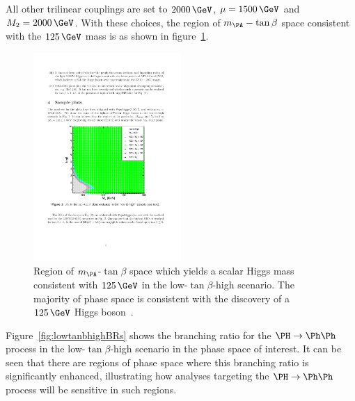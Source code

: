 
All other trilinear couplings are set to $2000\,\GeV$, $\mu=1500\,\GeV$ and
$M_{2}=2000\,\GeV$. With these choices, the region of $m_{\PA}-\tan\beta$ space
consistent with the $125\,\GeV$ mass is as shown in
figure~\ref{fig:lowtanbhighmass}.

\begin{figure}[htbp]
   \includegraphics[width=0.5\textwidth]{plots/theory/low-tanb-high-mass.pdf}
\caption[Region of $m_{\PA}$-$\tan\beta$ space which yields a scalar Higgs mass 
consistent with $125\,\GeV$ in the low-$\tan\beta$-high scenario.]{
    Region of $m_{\PA}$-$\tan\beta$ space which yields a scalar Higgs mass 
consistent with $125\,\GeV$ in the low-$\tan\beta$-high scenario. The
majority of phase space is consistent with the discovery of a $125\,\GeV$ Higgs
boson~\cite{lowtanbhighwiki}.}
\label{fig:lowtanbhighmass}
\end{figure}

Figure~\ref{fig:lowtanbhighBRs} shows the branching ratio for the $\PH\to\Ph\Ph$
process in the low-$\tan\beta$-high scenario in the phase space of interest. It
can be seen that there are regions of phase space where this branching ratio is
significantly enhanced, illustrating how analyses targeting the $\PH\to\Ph\Ph$ process will be
sensitive in such regions.

